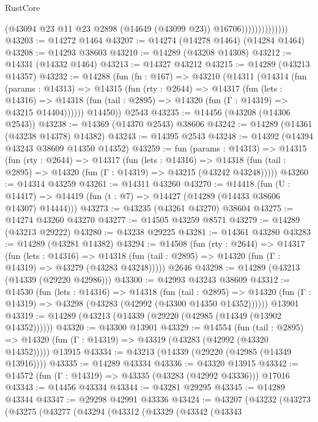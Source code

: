 \begin{lexlean}{RustCore}
\begin{coremodule}
                              (@43094 @23 @11 @23 @2898 (@14649 (@43099 @23)) @16706))))))))))))))
@43203 := @14272 @1464
@43207 := @14274 (@14278 @1464) (@14284 @1464)
@43208 := @14293 @38603
@43210 := @14289 (@43208 @14308)
@43212 := @14331 (@14332 @1464)
@43213 := @14327 @43212
@43215 := @14289 (@43213 @14357)
@43232 := @14288
    (fun (fn : @167) =>
    @43210
      (@14311
        (@14314
          (fun (params : @14313) =>
          @14315
            (fun (rty : @2644) =>
            @14317
              (fun (lets : @14316) =>
              @14318 (fun (tail : @2895) => @14320 (fun (Γ : @14319) => @43215 @14404))))))
        @14450))
    @2543
@43235 := @14456 (@43208 (@14306 @2543))
@43238 := @14369 (@14370 @2543) @38606
@43242 := @14289 (@14361 (@43238 @14378) @14382)
@43243 := @14395 @2543
@43248 := @14392 (@14394 @43243 @38609 @14350 @14352)
@43259 := fun (params : @14313) =>
  @14315
    (fun (rty : @2644) =>
    @14317
      (fun (lets : @14316) =>
      @14318 (fun (tail : @2895) => @14320 (fun (Γ : @14319) => @43215 (@43242 @43248)))))
@43260 := @14314 @43259
@43261 := @14311 @43260
@43270 := @14418
    (fun (U : @14417) => @14419 (fun (t : @7) => @14427 (@14289 (@14433 @38606 @14307) @14444)))
@43273 := @43235 (@43261 @43270) @38604
@43275 := @14274 @43260 @43270
@43277 := @14505 @43259 @8571
@43279 := @14289 (@43213 @29222)
@43280 := @43238 @29225
@43281 := @14361 @43280
@43283 := @14289 (@43281 @14382)
@43294 := @14508
    (fun (rty : @2644) =>
    @14317
      (fun (lets : @14316) =>
      @14318 (fun (tail : @2895) => @14320 (fun (Γ : @14319) => @43279 (@43283 @43248)))))
    @2646
@43298 := @14289 (@43213 (@14339 (@29220 @42986)))
@43300 := @42993 @43243 @38609
@43312 := @14530
    (fun (lets : @14316) =>
    @14318
      (fun (tail : @2895) =>
      @14320 (fun (Γ : @14319) => @43298 (@43283 (@42992 (@43300 @14350 @14352))))))
    @13901
@43319 := @14289 (@43213 (@14339 (@29220 (@42985 (@14349 (@13902 @14352))))))
@43320 := @43300 @13901
@43329 := @14554
    (fun (tail : @2895) => @14320 (fun (Γ : @14319) => @43319 (@43283 (@42992 (@43320 @14352)))))
    @13915
@43334 := @43213 (@14339 (@29220 (@42985 (@14349 @13916))))
@43335 := @14289 @43334
@43336 := @43320 @13915
@43342 := @14572 (fun (Γ : @14319) => @43335 (@43283 (@42992 @43336))) @17016
@43343 := @14456 @43334
@43344 := @43281 @29295
@43345 := @14289 @43344
@43347 := @29298 @42991 @43336
@43424 := @43207
    (@43232
      (@43273
        (@43275
          (@43277
            (@43294
              (@43312
                (@43329
                  (@43342
                    (@43343

\end{coremodule}
\end{lexlean}
